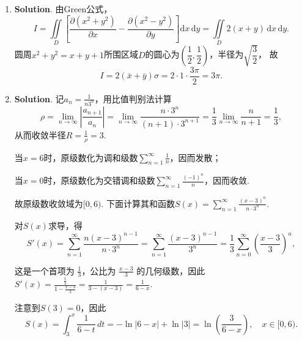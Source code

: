 \documentclass[../main.tex]{subfiles}
\begin{document}
\begin{enumerate}
  \item \textbf{Solution}. 由Green公式，
        \[
          I=\iint\limits_{D}\left[\frac{\partial(x^{2}+y^{2})}{\partial x}-\frac{\partial(x^{2}-y^{2})}{\partial y}\right]\mathrm{d}x\,\mathrm{d}y
          =\iint\limits_{D}2(x+y)\,\mathrm{d}x\,\mathrm{d}y.
        \]
        圆周$x^{2}+y^{2}=x+y+1$所围区域$D$的圆心为$\left(\dfrac12,\dfrac12\right)$，半径为$\sqrt{\dfrac32}$，
        故
        \[
          I=2(\bar{x}+\bar{y})\sigma=2\cdot1\cdot\frac{3\pi}{2}=3\pi.
        \]

  \item \textbf{Solution}. 记$a_n=\frac{1}{n3^n}$，用比值判别法计算
        \[
          \rho = \lim_{n \to \infty} \left| \frac{a_{n+1}}{a_n} \right| = \lim_{n \to \infty} \frac{n \cdot 3^n}{(n+1) \cdot 3^{n+1}} = \frac{1}{3} \lim_{n \to \infty} \frac{n}{n+1} = \frac{1}{3},
        \]
        从而收敛半径$R=\frac{1}{\rho}=3$.

        当$x=6$时，原级数化为调和级数$\sum_{n=1}^{\infty}\frac1n$，因而发散；

        当$x=0$时，原级数化为交错调和级数$\sum_{n=1}^{\infty}\frac{(-1)^n}{n}$，因而收敛.

        故原级数收敛域为$[0,6)$. 下面计算其和函数$S(x)=\sum_{n=1}^{\infty}\frac{(x-3)^n}{n\cdot3^n}$.

        对$S(x)$求导，得
        \[
          S'(x) = \sum_{n=1}^{\infty} \frac{n(x-3)^{n-1}}{n \cdot 3^n} = \sum_{n=1}^{\infty} \frac{(x-3)^{n-1}}{3^n}=\frac{1}{3}\sum_{n=0}^{\infty} \left(\frac{x-3}{3}\right)^n,
        \]

        这是一个首项为 $\frac{1}{3}$，公比为 $\frac{x-3}{3}$ 的几何级数，因此$S'(x) = \frac{\frac{1}{3}}{1 - \frac{x-3}{3}} = \frac{1}{3 - (x-3)} = \frac{1}{6-x}$.

        注意到$S(3) = 0$，因此
        \[
          S(x) = \int_{3}^{x} \frac{1}{6-t} \, dt = -\ln|6-x| + \ln|3| = \ln\left(\frac{3}{6-x}\right), \quad x \in [0, 6).
        \]

\end{enumerate}
\end{document}
